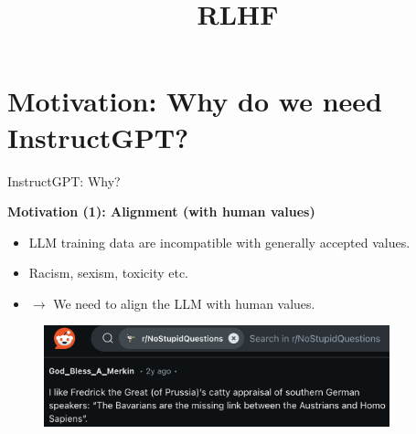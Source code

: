 



\def\myblue#1{\textcolor{texblue}{#1}}

\newcommand{\titlefigure}{figure/rlhfbackflip.png}
\newcommand{\learninggoals}{
\item Motivation for RLHF
\item How RLHF works
\item How to evaluate
\item Limitations
}

\title{RLHF}
\date{}





%









\section{Motivation: Why do we need InstructGPT?}

\begin{vbframe}{InstructGPT: Why?}

\vfill

\textbf{Motivation (1): Alignment (with human values)}

	\begin{itemize}
		\item LLM training data are incompatible
		with generally accepted values.
		\item Racism, sexism, toxicity etc.
		\item $\rightarrow$ We need to align the LLM
		with human values.
	\end{itemize}

\vfill

\end{vbframe}

\begin{vbframe}
\begin{figure}
\centering
\includegraphics[width = 10cm]{figure/bavarianjoke.png}
\end{figure}





\vfill

\end{vbframe}




